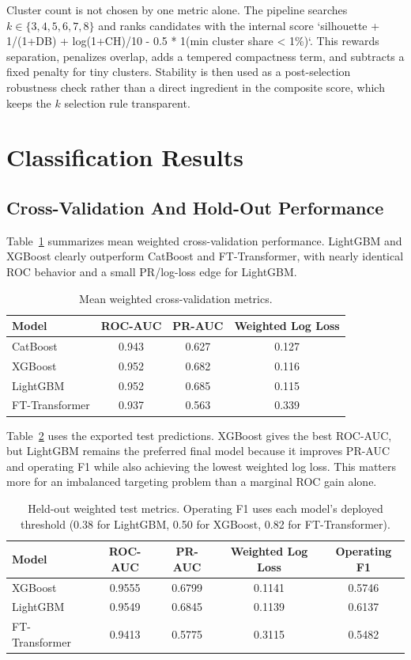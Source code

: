 \documentclass[12pt]{article}
\begin{document}
Cluster count is not chosen by one metric alone. The pipeline searches
$k \in \{3,4,5,6,7,8\}$ and ranks candidates with the internal score
`silhouette + 1/(1+DB) + log(1+CH)/10 - 0.5 * 1(min cluster share < 1\%)`.
This rewards separation, penalizes overlap, adds a tempered compactness term,
and subtracts a fixed penalty for tiny clusters. Stability is then used as a
post-selection robustness check rather than a direct ingredient in the
composite score, which keeps the $k$ selection rule transparent.

\section{Classification Results}

\subsection{Cross-Validation And Hold-Out Performance}

Table~\ref{tab:cv-results} summarizes mean weighted cross-validation
performance. LightGBM and XGBoost clearly outperform CatBoost and
FT-Transformer, with nearly identical ROC behavior and a small PR/log-loss edge
for LightGBM.

\begin{table}[!htbp]
\centering
\small
\caption{Mean weighted cross-validation metrics.}
\label{tab:cv-results}
\begin{tabular}{lccc}
\toprule
Model & ROC-AUC & PR-AUC & Weighted Log Loss \\
\midrule
CatBoost & 0.943 & 0.627 & 0.127 \\
XGBoost & 0.952 & 0.682 & 0.116 \\
LightGBM & 0.952 & 0.685 & 0.115 \\
FT-Transformer & 0.937 & 0.563 & 0.339 \\
\bottomrule
\end{tabular}
\end{table}

Table~\ref{tab:test-results} uses the exported test predictions. XGBoost gives
the best ROC-AUC, but LightGBM remains the preferred final model because it
improves PR-AUC and operating F1 while also achieving the lowest weighted log
loss. This matters more for an imbalanced targeting problem than a marginal ROC
gain alone.

\begin{table}[!htbp]
\centering
\small
\caption{Held-out weighted test metrics. Operating F1 uses each model's deployed threshold
(0.38 for LightGBM, 0.50 for XGBoost, 0.82 for FT-Transformer).}
\label{tab:test-results}
\begin{tabular}{lcccc}
\toprule
Model & ROC-AUC & PR-AUC & Weighted Log Loss & Operating F1 \\
\midrule
XGBoost & 0.9555 & 0.6799 & 0.1141 & 0.5746 \\
LightGBM & 0.9549 & 0.6845 & 0.1139 & 0.6137 \\
FT-Transformer & 0.9413 & 0.5775 & 0.3115 & 0.5482 \\
\bottomrule
\end{tabular}
\end{table}
\end{document}
